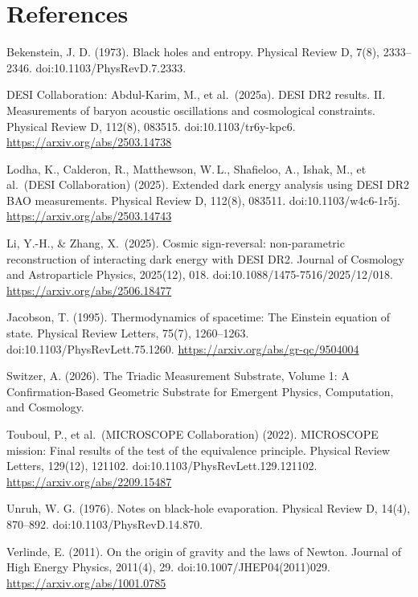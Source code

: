 \documentclass[11pt,oneside]{report}
\theoremstyle{definition}
\theoremstyle{remark}
\newenvironment{reflist}
  {\par\small\setlength{\parindent}{0pt}%
   \setlength{\leftskip}{1.6em}\setlength{\parindent}{-1.6em}%
   \setlength{\parskip}{0.4em}%
   \raggedright\hyphenpenalty=50\exhyphenpenalty=50\relax
   \sloppy}
  {\par}
\begin{document}
\section*{References}
\begin{reflist}
Bekenstein, J. D. (1973). Black holes and entropy. Physical Review D,
7(8), 2333--2346. doi:10.1103/PhysRevD.7.2333.

DESI Collaboration: Abdul-Karim, M., et al.\ (2025a). DESI DR2 results.
II. Measurements of baryon acoustic oscillations and cosmological
constraints. Physical Review D, 112(8), 083515. doi:10.1103/tr6y-kpc6.
\url{https://arxiv.org/abs/2503.14738}

Lodha, K., Calderon, R., Matthewson, W.\,L., Shafieloo, A., Ishak, M.,
et al.\ (DESI Collaboration) (2025). Extended dark energy analysis using
DESI DR2 BAO measurements. Physical Review D, 112(8), 083511.
doi:10.1103/w4c6-1r5j. \url{https://arxiv.org/abs/2503.14743}

Li, Y.-H., \& Zhang, X.\ (2025). Cosmic sign-reversal: non-parametric
reconstruction of interacting dark energy with DESI DR2. Journal of
Cosmology and Astroparticle Physics, 2025(12), 018.
doi:10.1088/1475-7516/2025/12/018. \url{https://arxiv.org/abs/2506.18477}

Jacobson, T. (1995). Thermodynamics of spacetime: The Einstein equation
of state. Physical Review Letters, 75(7), 1260--1263.
doi:10.1103/PhysRevLett.75.1260. \url{https://arxiv.org/abs/gr-qc/9504004}

Switzer, A. (2026). The Triadic Measurement Substrate, Volume 1: A
Confirmation-Based Geometric Substrate for Emergent Physics, Computation,
and Cosmology.

Touboul, P., et al.\ (MICROSCOPE Collaboration) (2022). MICROSCOPE
mission: Final results of the test of the equivalence principle. Physical
Review Letters, 129(12), 121102. doi:10.1103/PhysRevLett.129.121102.
\url{https://arxiv.org/abs/2209.15487}

Unruh, W. G. (1976). Notes on black-hole evaporation. Physical Review D,
14(4), 870--892. doi:10.1103/PhysRevD.14.870.

Verlinde, E. (2011). On the origin of gravity and the laws of Newton.
Journal of High Energy Physics, 2011(4), 29. doi:10.1007/JHEP04(2011)029.
\url{https://arxiv.org/abs/1001.0785}
\end{reflist}

\clearpage
\end{document}
